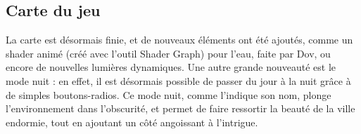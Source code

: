 \subsection{Carte du jeu}

La carte est désormais finie, et de nouveaux éléments ont été ajoutés, comme un shader animé (créé avec l'outil Shader Graph) pour l'eau,
faite par Dov, ou encore de nouvelles lumières dynamiques. Une autre grande nouveauté est le mode nuit : en effet,
il est désormais possible de passer du jour à la nuit grâce à de simples boutons-radios. Ce mode nuit, comme l'indique
son nom, plonge l'environnement dans l'obscurité, et permet de faire ressortir la beauté de la ville endormie, tout
en ajoutant un côté angoissant à l'intrigue.

